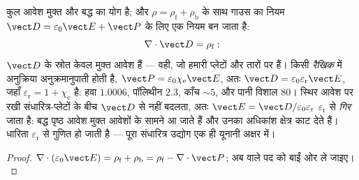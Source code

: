 \begin{proposition}[विस्थापन क्षेत्र]\label{prop:b3:electromagnetism-in-matter:displacement}
कुल आवेश मुक्त और बद्ध का योग है; और $\rho =
\rho_{\text{f}} + \rho_{\text{b}}$ के साथ गाउस का नियम
\emph{} $\vect D = \varepsilon_0\vect E +
\vect P$ के लिए एक नियम बन जाता है:
\[
\nabla\cdot\vect D = \rho_{\text{f}} :
\]
$\vect D$ के स्रोत केवल मुक्त आवेश हैं --- वही, जो हमारी प्लेटों और
तारों पर हैं। किसी \emph{रैखिक}  में अनुक्रिया
अनुक्रमानुपाती होती है, $\vect P = \varepsilon_0\chi_{\text{e}}\vect E$, अतः
$\vect D = \varepsilon_0\varepsilon_{\text{r}}\vect E$, जहाँ
$\varepsilon_{\text{r}} = 1 + \chi_{\text{e}}$ \emph{} है: हवा $1.0006$, पॉलिथीन $2.3$, काँच $\sim 5$,
और पानी विशाल $80$। स्थिर आवेश पर रखी संधारित्र-प्लेटों के बीच
$\vect D$  से नहीं बदलता, अतः $\vect E =
\vect D/\varepsilon_0\varepsilon_{\text{r}}$
$\varepsilon_{\text{r}}$ से \emph{गिर} जाता है: बद्ध पृष्ठ आवेश मुक्त
आवेशों के सामने आ जाते हैं और उनका अधिकांश क्षेत्र काट देते हैं।
धारिता $\varepsilon_{\text{r}}$ से गुणित हो जाती है --- पूरा
संधारित्र उद्योग एक ही यूनानी अक्षर में।
\end{proposition}

\begin{proof}
$\nabla\cdot(\varepsilon_0\vect E) = \rho_{\text{f}} +
\rho_{\text{b}} = \rho_{\text{f}} - \nabla\cdot\vect P$; अब
 वाले पद को बाईं ओर ले जाइए।
\end{proof}

